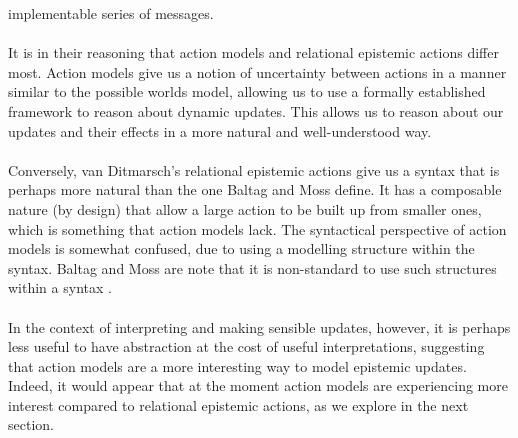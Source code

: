 implementable series of messages.\\
\\
It is in their reasoning that action models and relational epistemic actions
differ most.
Action models give us a notion of uncertainty between actions in a manner
similar to the possible worlds model, allowing us to use a formally established framework
to reason about dynamic updates.
This allows us to reason about our updates and their effects in a more natural
and well-understood way.\\
\\
Conversely, van Ditmarsch's relational epistemic actions give us a syntax that
is perhaps more natural than the one Baltag and Moss define.
It has a composable nature (by design) that allow a large action to be built up from smaller ones, which is
something that action models lack.
The syntactical perspective of action models is somewhat confused, due to using a modelling
structure within the syntax.
Baltag and Moss are note that it is non-standard to use such structures
within a syntax \cite{baltag2005programs}.\\
\\
In the context of interpreting and making sensible updates, however, it is
perhaps less useful to have abstraction at the cost of useful interpretations,
suggesting that action models are a more interesting way to model epistemic
updates.
Indeed, it would appear that at the moment action models are experiencing more
interest compared to relational epistemic actions, as we explore in the next
section.

